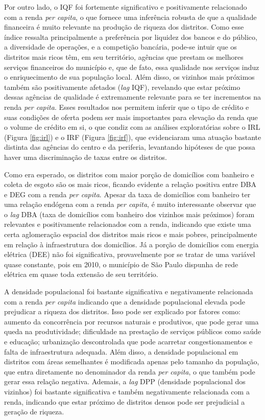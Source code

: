 \documentclass[a4paper,12pt]{article}
\begin{document}
Por outro lado, o IQF foi fortemente significativo e positivamente
relacionado com a renda \emph{per capita}, o que fornece uma inferência
robusta de que a qualidade financeira é muito relevante na produção de
riqueza dos distritos. Como esse índice ressalta principalmente a
preferência por liquidez dos bancos e do público, a diversidade de
operações, e a competição bancária, pode-se intuir que os distritos mais
ricos têm, em seu território, agências que prestam os melhores serviços
financeiros do município e, que de fato, essa qualidade nos serviços
induz o enriquecimento de sua população local. Além disso, os vizinhos
mais próximos também são positivamente afetados (\emph{lag} IQF),
revelando que estar próximo dessas agências de qualidade é extremamente
relevante para se ter incrementos na renda \emph{per capita}. Esses
resultados nos permitem inferir que o tipo de crédito e suas condições
de oferta podem ser mais importantes para elevação da renda que o volume
de crédito em si, o que condiz com as análises exploratórias sobre o IRL
(Figura \ref{fig:irl}) e o IRF (Figura \ref{fig:irf}), que evidenciaram
uma atuação bastante distinta das agências do centro e da periferia,
levantando hipóteses de que possa haver uma discriminação de taxas entre
os distritos.

Como era esperado, os distritos com maior porção de domicílios com
banheiro e coleta de esgoto são os mais ricos, ficando evidente a
relação positiva entre DBA e DEG com a renda \emph{per capita}. Apesar
da taxa de domicílios com banheiro ter uma relação endógena com a renda
\emph{per capita}, é muito interessante observar que o \emph{lag} DBA
(taxa de domicílios com banheiro dos vizinhos mais próximos) foram
relevantes e positivamente relacionados com a renda, indicando que
existe uma certa aglomeração espacial dos distritos mais ricos e mais
pobres, principalmente em relação à infraestrutura dos domicílios. Já a
porção de domicílios com energia elétrica (DEE) não foi significativa,
provavelmente por se tratar de uma variável quase constante, pois em
2010, o município de São Paulo dispunha de rede elétrica em quase toda
extensão de seu território.

A densidade populacional foi bastante significativa e negativamente
relacionada com a renda \emph{per capita} indicando que a densidade
populacional elevada pode prejudicar a riqueza dos distritos. Isso pode
ser explicado por fatores como: aumento da concorrência por recursos
naturais e produtivos, que pode gerar uma queda na produtividade;
dificuldade na prestação de serviços públicos como saúde e educação;
urbanização descontrolada que pode acarretar congestionamentos e falta
de infraestrutura adequada. Além disso, a densidade populacional em
distritos com áreas semelhantes é modificada apenas pelo tamanho da
população, que entra diretamente no denominador da renda \emph{per
capita}, o que também pode gerar essa relação negativa. Ademais, a
\emph{lag} DPP (densidade populacional dos vizinhos) foi bastante
significativa e também negativamente relacionada com a renda, indicando
que estar próximo de distritos densos pode ser prejudicial a geração de
riqueza.
\end{document}
